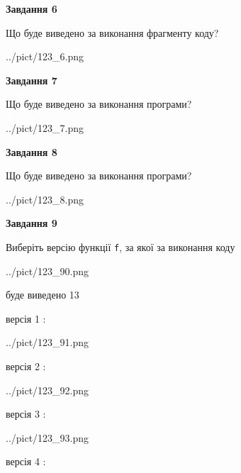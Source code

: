 \documentclass[12pt, ukrainian]{article}
\def\code#1{\Verb!#1!}
\begin{document}
{\begin {large}
{\begin {center}\textbf{Завдання 6}\end {center}}

Що буде виведено за виконання фрагменту коду?\par
\begin{center}
	{../pict/123_6.png}
\end{center}
\newpage

{\begin {center}\textbf{Завдання 7}\end {center}}

Що буде виведено за виконання програми?\par
\begin{center}
	{../pict/123_7.png}
\end{center}
\newpage

{\begin {center}\textbf{Завдання 8}\end {center}}

Що буде виведено за виконання програми?\par
\begin{center}
	{../pict/123_8.png}
\end{center}
\newpage

{\begin {center}\textbf{Завдання 9}\end {center}}

Виберіть версію функції \code{f}, за якої за виконання коду
\begin{center}
	{../pict/123_90.png}
\end{center}
буде виведено 13

\vspace{5mm}
версія 1 :

\begin{center}
	{../pict/123_91.png}
\end{center}
версія 2 :

\begin{center}
	{../pict/123_92.png}
\end{center}
версія 3 :

\begin{center}
	{../pict/123_93.png}
\end{center}
версія 4 :


\end{large}}
\end{document}
